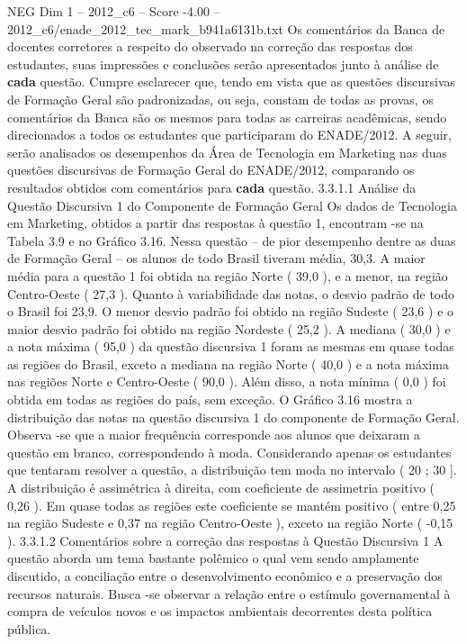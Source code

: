 \begin{textsample}{NEG Dim 1 – 2012\_c6 – Score -4.00 – 2012\_c6/enade\_2012\_tec\_mark\_b941a6131b.txt}
Os comentários da Banca de docentes corretores a respeito do observado na correção das respostas dos estudantes, suas impressões e conclusões serão apresentados junto à análise de \textbf{cada} questão.
Cumpre esclarecer que, tendo em vista que as questões discursivas de Formação Geral são padronizadas, ou seja, constam de todas as provas, os comentários da Banca são os mesmos para todas as carreiras acadêmicas, sendo direcionados a todos os estudantes que participaram do ENADE/2012.
A seguir, serão analisados os desempenhos da Área de Tecnologia em Marketing nas duas questões discursivas de Formação Geral do ENADE/2012, comparando os resultados obtidos com comentários para \textbf{cada} questão. 3.3.1.1 Análise da Questão Discursiva 1 do Componente de Formação Geral Os dados de Tecnologia em Marketing, obtidos a partir das respostas à questão 1, encontram -se na Tabela 3.9 e no Gráfico 3.16.
Nessa questão – de pior desempenho dentre as duas de Formação Geral – os alunos de todo Brasil tiveram média, 30,3.
A maior média para a questão 1 foi obtida na região Norte ( 39,0 ), e a menor, na região Centro-Oeste ( 27,3 ).
Quanto à variabilidade das notas, o desvio padrão de todo o Brasil foi 23,9.
O menor desvio padrão foi obtido na região Sudeste ( 23,6 ) e o maior desvio padrão foi obtido na região Nordeste ( 25,2 ).
A mediana ( 30,0 ) e a nota máxima ( 95,0 ) da questão discursiva 1 foram as mesmas em quase todas as regiões do Brasil, exceto a mediana na região Norte ( 40,0 ) e a nota máxima nas regiões Norte e Centro-Oeste ( 90,0 ).
Além disso, a nota mínima ( 0,0 ) foi obtida em todas as regiões do país, sem exceção.
O Gráfico 3.16 mostra a distribuição das notas na questão discursiva 1 do componente de Formação Geral.
Observa -se que a maior frequência corresponde aos alunos que deixaram a questão em branco, correspondendo à moda.
Considerando apenas os estudantes que tentaram resolver a questão, a distribuição tem moda no intervalo ( 20 ; 30 ].
A distribuição é assimétrica à direita, com coeficiente de assimetria positivo ( 0,26 ).
Em quase todas as regiões este coeficiente se mantém positivo ( entre 0,25 na região Sudeste e 0,37 na região Centro-Oeste ), exceto na região Norte ( -0,15 ). 3.3.1.2 Comentários sobre a correção das respostas à Questão Discursiva 1 A questão aborda um tema bastante polêmico o qual vem sendo amplamente discutido, a conciliação entre o desenvolvimento econômico e a preservação dos recursos naturais.
Busca -se observar a relação entre o estímulo governamental à compra de veículos novos e os impactos ambientais decorrentes desta política pública.

\end{textsample}

